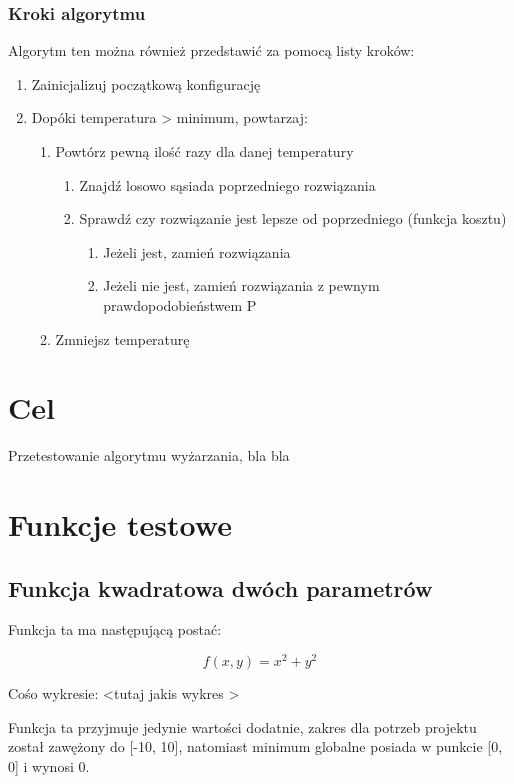 \documentclass[12pt]{report}
\newcommand{\si}{ś}
\begin{document}
{			\subsection{Kroki algorytmu}
Algorytm ten można również przedstawić za pomocą listy kroków:

\begin{enumerate}
	\item Zainicjalizuj początkową konfigurację
	\item Dopóki temperatura > minimum, powtarzaj:
	\begin{enumerate}
		\item Powtórz pewną ilość razy dla danej temperatury
		\begin{enumerate}
			\item Znajdź losowo sąsiada poprzedniego rozwiązania
			\item Sprawdź czy rozwiązanie jest lepsze od poprzedniego (funkcja kosztu)
			\begin{enumerate}
				\item Jeżeli jest, zamień rozwiązania
				\item Jeżeli nie jest, zamień rozwiązania z pewnym prawdopodobieństwem P
			\end{enumerate}
		\end{enumerate}
		\item Zmniejsz temperaturę
	\end{enumerate}
\end{enumerate}

	\chapter{Cel}
	Przetestowanie algorytmu wyżarzania, bla bla
	\chapter{Funkcje testowe}
		\section{Funkcja kwadratowa dwóch parametrów}
Funkcja ta ma następującą postać:

\[f(x, y) = x^2 + y^2 \]

Co\si o wykresie:
<tutaj jakis wykres >

Funkcja ta przyjmuje jedynie warto\si ci dodatnie, zakres dla potrzeb projektu został zawężony do [-10, 10], natomiast minimum globalne posiada w punkcie [0, 0] i wynosi 0. 



}
\end{document}
